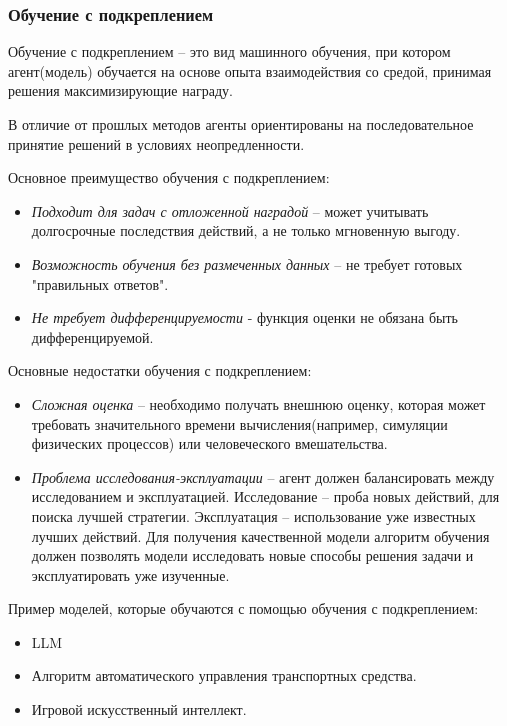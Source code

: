 \documentclass[../part_1.tex]{subfiles}
\begin{document}
\subsubsection{Обучение с подкреплением}
    \label{sec:reinforcement_learning}
    \par Обучение с подкреплением --  это вид машинного обучения, при котором агент(модель) обучается на основе опыта взаимодействия со средой, принимая решения максимизирующие награду.
    \par В отличие от прошлых методов агенты ориентированы на последовательное принятие решений в условиях неопредленности.
    
    \par Основное преимущество обучения с подкреплением:
    \begin{itemize}
        \item \textit{Подходит для задач с отложенной наградой} -- может учитывать долгосрочные последствия действий, а не только мгновенную выгоду.
        \item \textit{Возможность обучения без размеченных данных} -- не требует готовых "правильных ответов".
        \item \textit{Не требует дифференцируемости} - функция оценки не обязана быть дифференцируемой.
    \end{itemize}
    \par Основные недостатки обучения с подкреплением:
    \begin{itemize}
        \item \textit{Сложная оценка} -- необходимо получать внешнюю оценку, которая может требовать значительного времени вычисления(например, симуляции физических процессов) или человеческого вмешательства.
        \item \textit{Проблема исследования-эксплуатации} -- агент должен балансировать между исследованием и эксплуатацией. Исследование -- проба новых действий, для поиска лучшей стратегии. Эксплуатация -- использование уже известных лучших действий. Для получения качественной модели алгоритм обучения должен позволять модели исследовать новые способы решения задачи и эксплуатировать уже изученные.
    \end{itemize}
    \par Пример моделей, которые обучаются с помощью обучения с подкреплением:
    \begin{itemize}
        \item LLM\cite{llm}
        \item Алгоритм автоматического управления транспортных средства.
        \item Игровой искусственный интеллект.
    \end{itemize}
\end{document}
